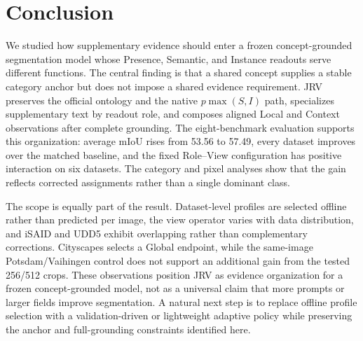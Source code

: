 \section{Conclusion}
\label{sec:conclusion}

We studied how supplementary evidence should enter a frozen concept-grounded segmentation model whose Presence, Semantic, and Instance readouts serve different functions. The central finding is that a shared concept supplies a stable category anchor but does not impose a shared evidence requirement. JRV preserves the official ontology and the native $p\max(S,I)$ path, specializes supplementary text by readout role, and composes aligned Local and Context observations after complete grounding. The eight-benchmark evaluation supports this organization: average mIoU rises from 53.56 to 57.49, every dataset improves over the matched baseline, and the fixed Role--View configuration has positive interaction on six datasets. The category and pixel analyses show that the gain reflects corrected assignments rather than a single dominant class.

The scope is equally part of the result. Dataset-level profiles are selected offline rather than predicted per image, the view operator varies with data distribution, and iSAID and UDD5 exhibit overlapping rather than complementary corrections. Cityscapes selects a Global endpoint, while the same-image Potsdam/Vaihingen control does not support an additional gain from the tested 256/512 crops. These observations position JRV as evidence organization for a frozen concept-grounded model, not as a universal claim that more prompts or larger fields improve segmentation. A natural next step is to replace offline profile selection with a validation-driven or lightweight adaptive policy while preserving the anchor and full-grounding constraints identified here.
